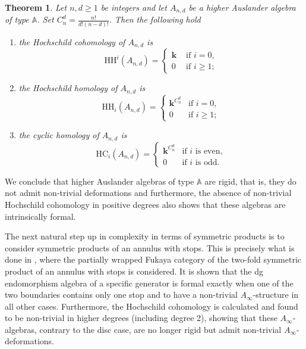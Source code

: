 \documentclass{amsart}
\newcommand{\A}{\mathbb{A}}
\newcommand{\bk}{\mathbf{k}}
\newcommand{\HH}{\mathrm{HH}}
\newcommand{\HC}{\mathrm{HC}}
\theoremstyle{plain}
\newtheorem{Thm}{Theorem}[section]
\theoremstyle{definition}
\numberwithin{equation}{section}
\newcommand{\can}[1]{\textcolor{red}{#1 } }
\begin{document}
\begin{Thm}%
    Let $n, d \geq 1$ be integers and let $A_{n,d}$ be a higher Auslander algebra of type $\A$. Set $C^d_n = \frac{n!}{d!(n-d)!}$. Then the following hold

    \begin{enumerate}
        \item   the Hochschild cohomology of $A_{n,d}$ is
        \[\HH^i(A_{n,d})=\begin{cases}
        \bk & \text{ if $i=0$},\\ 0 & \text{ if $i\ge 1$};
    \end{cases}\]
    \item the Hochschild homology of $A_{n,d}$ is
    \[\HH_i(A_{n,d})=\begin{cases}
        \bk^{C_n^d} & \text{if $i=0$},\\ 0 & \text{if $i\ge 1$};
    \end{cases}\]
    
    \item the cyclic homology of $A_{n,d}$ is  \[\HC_i(A_{n,d})=\begin{cases}
        \bk^{C_n^d} & \text{if $i$ is even},\\ 0 & \text{if $i$ is odd}.
    \end{cases}\]
    \end{enumerate}
\end{Thm}

We conclude that higher Auslander algebras of type $\A$  are  rigid, that is, they do not admit non-trivial deformations and furthermore, the absence of non-trivial Hochschild cohomology in positive degrees also shows that these algebras are  intrinsically formal.

The next natural step up in complexity in terms of symmetric products is to consider symmetric products of an annulus with stops. This is precisely what is done in \cite{LuWang26}, where the partially wrapped Fukaya category of the two-fold symmetric product of an annulus with stops is considered. It is shown that the dg endomorphism algebra of a specific generator is formal exactly
when one of the two boundaries contains only one stop and to have a non-trivial $A_\infty$-structure in all other cases. Furthermore, the Hochschild cohomology is calculated and found to be non-trivial in higher degrees (including degree 2), showing that these $A_\infty$-algebras, contrary to the disc case, are no longer rigid but admit non-trivial $A_\infty$-deformations.
\end{document}
